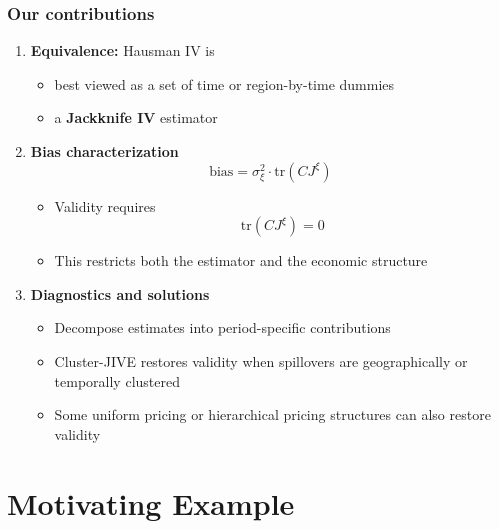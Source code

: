 \documentclass[notes,11pt, aspectratio=169]{beamer}
\begin{document}
\begin{frame}
\frametitle{Our contributions}

\begin{enumerate}
    \item \textbf{Equivalence:} Hausman IV is 
    \begin{itemize}
        \item best viewed as a set of time or region-by-time dummies
        \item a \textbf{Jackknife IV} estimator
    \end{itemize}

    \vspace{0.15cm}

    \item \textbf{Bias characterization}
    \[
    \text{bias} = \sigma_{\xi}^2 \cdot \mathrm{tr}(C J^{\xi})
    \]
    \begin{itemize}
        \item Validity requires
        \[
        \mathrm{tr}(C J^{\xi})=0
        \]
        \item This restricts both the estimator and the economic structure
    \end{itemize}

    \vspace{0.15cm}

    \item \textbf{Diagnostics and solutions}
    \begin{itemize}
        \item Decompose estimates into period-specific contributions
        \item Cluster-JIVE restores validity when spillovers are geographically or temporally clustered
        \item Some uniform pricing or hierarchical pricing structures can also restore validity
    \end{itemize}
\end{enumerate}

\end{frame}

\section{Motivating Example}
\end{document}
